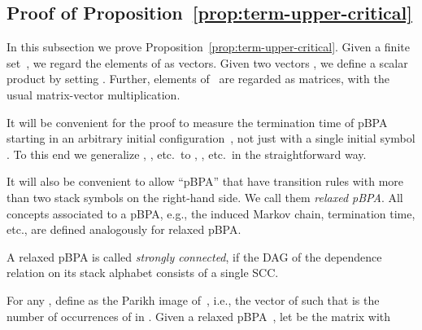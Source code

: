 \subsection{Proof of Proposition~\ref{prop:term-upper-critical}} \label{app:term-upper-critical}

In this subsection we prove Proposition~\ref{prop:term-upper-critical}.
Given a finite set~, we regard the elements of  as vectors.
Given two vectors , we define a scalar product by setting .
Further, elements of~ are regarded as matrices, with the usual matrix-vector multiplication.

It will be convenient for the proof to measure the termination time of pBPA starting in an arbitrary initial configuration~,
 not just with a single initial symbol .
To this end we generalize , , etc.\ to , , etc.\ in the straightforward way.

It will also be convenient to allow ``pBPA'' that have transition rules with more than two stack symbols on the right-hand side.
We call them {\em relaxed pBPA}.
All concepts associated to a pBPA, e.g., the induced Markov chain, termination time, etc., are defined analogously for relaxed pBPA.

A relaxed pBPA is called {\em strongly connected}, if the DAG of the dependence relation on its stack alphabet consists of a single SCC.

For any , define  as the Parikh image of~,
 i.e., the vector of  such that  is the number of occurrences of  in .
Given a relaxed pBPA~, let  be the matrix with
 

